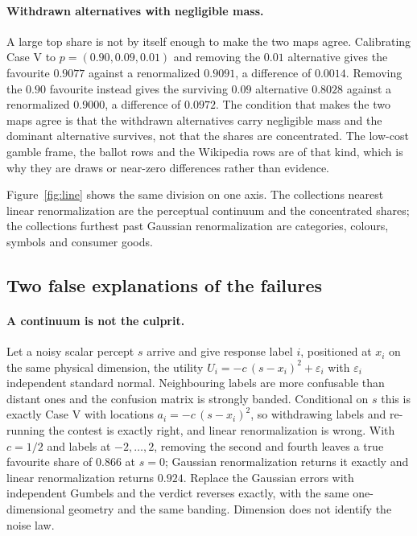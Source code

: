 \documentclass[11pt]{article}
\begin{document}
\paragraph{Withdrawn alternatives with negligible mass.} A large top share is not by itself
enough to make the two maps agree. Calibrating Case V to $p = (0.90, 0.09, 0.01)$ and removing
the $0.01$ alternative gives the favourite $0.9077$ against a renormalized $0.9091$, a
difference of $0.0014$. Removing the $0.90$ favourite instead gives the surviving $0.09$
alternative $0.8028$ against a renormalized $0.9000$, a difference of $0.0972$. The condition
that makes the two maps agree is that the withdrawn alternatives carry negligible mass and the
dominant alternative survives, not that the shares are concentrated. The low-cost gamble frame,
the ballot rows and the Wikipedia rows are of that kind, which is why they are draws or
near-zero differences rather than evidence.

Figure~\ref{fig:line} shows the same division on one axis. The collections nearest linear
renormalization are the perceptual continuum and the concentrated shares; the collections
furthest past Gaussian renormalization are categories, colours, symbols and consumer goods.

\subsection{Two false explanations of the failures}
\label{sec:notculprit}

\paragraph{A continuum is not the culprit.} Let a noisy scalar percept $s$ arrive and give
response label $i$, positioned at $x_i$ on the same physical dimension, the utility
$U_i = -c\,(s - x_i)^2 + \varepsilon_i$ with $\varepsilon_i$ independent standard normal.
Neighbouring labels are more confusable than distant ones and the confusion matrix is strongly
banded. Conditional on $s$ this is exactly Case V with locations $a_i = -c\,(s-x_i)^2$, so
withdrawing labels and re-running the contest is exactly right, and linear renormalization is
wrong. With $c = 1/2$ and labels at $-2,\dots,2$, removing the second and fourth leaves a true
favourite share of $0.866$ at $s=0$; Gaussian renormalization returns it exactly and linear
renormalization returns $0.924$. Replace the Gaussian errors with independent Gumbels and the
verdict reverses exactly, with the same one-dimensional geometry and the same banding. Dimension
does not identify the noise law.
\end{document}
